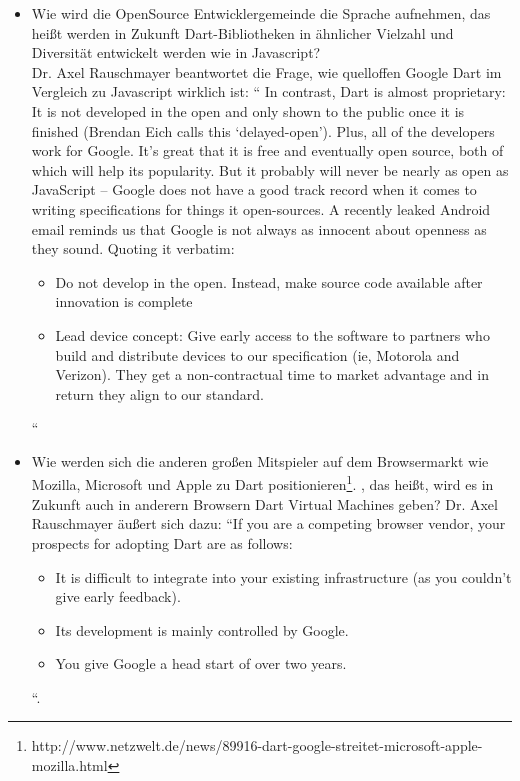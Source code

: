 \begin{itemize}
\item Wie wird die OpenSource Entwicklergemeinde die Sprache aufnehmen, das heißt werden in Zukunft  Dart-Bibliotheken in ähnlicher Vielzahl und Diversität entwickelt werden wie in Javascript? 
\\
Dr. Axel Rauschmayer beantwortet die Frage, wie quelloffen Google Dart im Vergleich zu Javascript wirklich ist: “
In contrast, Dart is almost proprietary: It is not developed in the open and only shown to the public once it is finished (Brendan Eich calls this ‘delayed-open’). Plus, all of the developers work for Google. It’s great that it is free and eventually open source, both of which will help its popularity. But it probably will never be nearly as open as JavaScript – Google does not have a good track record when it comes to writing specifications for things it open-sources. A recently leaked Android email reminds us that Google is not always as innocent about openness as they sound. Quoting it verbatim:
\begin{itemize}
    \item Do not develop in the open. Instead, make source code available after innovation is complete
    \item Lead device concept: Give early access to the software to partners who build and distribute devices to our specification (ie, Motorola and Verizon). They get a non-contractual time to market advantage and in return they align to our standard.
    \end{itemize}“\cite{google-dart}
\item Wie werden sich die anderen großen Mitspieler auf dem Browsermarkt wie Mozilla, Microsoft und Apple zu Dart positionieren\footnote{http://www.netzwelt.de/news/89916-dart-google-streitet-microsoft-apple-mozilla.html}. , das heißt, wird es in Zukunft auch in anderern Browsern Dart Virtual Machines geben?
Dr. Axel Rauschmayer äußert sich dazu: “If you are a competing browser vendor, your prospects for adopting Dart are as follows:
\begin{itemize}
\item    It is difficult to integrate into your existing infrastructure (as you couldn’t give early feedback).
\item    Its development is mainly controlled by Google.
\item    You give Google a head start of over two years.
\end{itemize}
“\cite{google-dart}.
\end{itemize}


